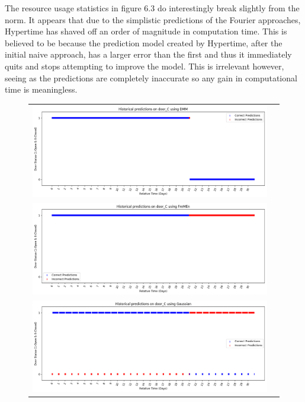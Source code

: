 The resource usage statistics in figure 6.3 do interestingly break slightly
from the norm. It appears that due to the simplistic predictions of the
Fourier approaches, Hypertime has shaved off an order of magnitude in
computation time. This is believed to be because the prediction model created
by Hypertime, after the initial naive approach, has a larger error than the first and thus it immediately quits
and stops attempting to improve the model. This is irrelevant however, seeing
as the predictions are completely inaccurate so any gain in computational time
is meaningless. \\

\begin{center}
\begin{figure}[!Hp]
  \begin{tabular}{cc}
    {\includegraphics[width = 6in]{images/results/Historical_door_C_DMM.png}} \\
    {\includegraphics[width = 6in]{images/results/Historical_door_C_FreMEn.png}} \\
    {\includegraphics[width = 6in]{images/results/Historical_door_C_Gaussian.png}} \\

\end{tabular}
\end{figure}
\end{center}
